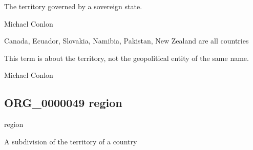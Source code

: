 \documentclass[letterpaper,10pt,english]{sphinxmanual}
\begin{document}
\begin{sphinxShadowBox}

\sphinxAtStartPar
The territory governed by a sovereign state.
\end{sphinxShadowBox}

\begin{sphinxShadowBox}

\sphinxAtStartPar
Michael Conlon 
\end{sphinxShadowBox}

\begin{sphinxShadowBox}

\sphinxAtStartPar
Canada, Ecuador, Slovakia, Namibia, Pakistan, New Zealand are all countries
\end{sphinxShadowBox}

\begin{sphinxShadowBox}

\sphinxAtStartPar
This term is about the territory, not the geopolitical entity of the same name.
\end{sphinxShadowBox}

\begin{sphinxShadowBox}

\sphinxAtStartPar
Michael Conlon 
\end{sphinxShadowBox}
\begin{quote}

\ignorespaces \end{quote}


\subsection{ORG\_0000049 \sphinxhyphen{} region}
\label{\detokenize{doc-ORG_0000049:org-0000049-region}}\label{\detokenize{doc-ORG_0000049:index-0}}\label{\detokenize{doc-ORG_0000049::doc}}
\begin{sphinxShadowBox}

\sphinxAtStartPar
region
\end{sphinxShadowBox}

\begin{sphinxShadowBox}

\sphinxAtStartPar
A subdivision of the territory of a country
\end{sphinxShadowBox}
\end{document}
